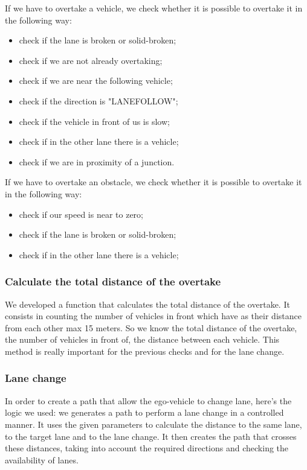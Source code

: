 \documentclass{article}
\begin{document}
If we have to overtake a vehicle, we check whether it is possible to overtake it in the following way:
\begin{itemize}
    \item check if the lane is broken or solid-broken;
    \item check if we are not already overtaking;
    \item check if we are near the following vehicle;
    \item check if the direction is "LANEFOLLOW";
    \item check if the vehicle in front of us is slow;
    \item check if in the other lane there is a vehicle;
    \item check if we are in proximity of a junction.
\end{itemize}

If we have to overtake an obstacle, we check whether it is possible to overtake it in the following way:
\begin{itemize}
    \item check if our speed is near to zero;
    \item check if the lane is broken or solid-broken;
    \item check if in the other lane there is a vehicle;
\end{itemize}

\subsubsection*{Calculate the total distance of the overtake}
We developed a function that calculates the total distance of the overtake.
It consists in counting the number of vehicles in front which have as their distance from each other max 15 meters. 
So we know the total distance of the overtake, the number of vehicles in front of, the distance between each vehicle.
This method is really important for the previous checks and for the lane change.

\subsubsection*{Lane change}
In order to create a path that allow the ego-vehicle to change lane, here's the logic we used:
we generates a path to perform a lane change in a controlled manner. It uses the given parameters to 
calculate the distance to the same lane, to the target lane and to the lane change. It then creates 
the path that crosses these distances, taking into account the required directions and checking the 
availability of lanes. 
\end{document}
